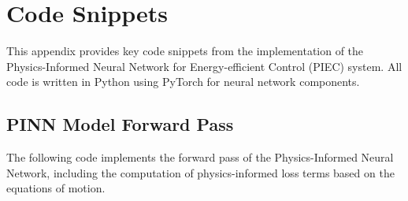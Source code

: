 \chapter{Code Snippets}
\label{appendix:code}

This appendix provides key code snippets from the implementation of the Physics-Informed Neural Network for Energy-efficient Control (PIEC) system. All code is written in Python using PyTorch for neural network components.

\section{PINN Model Forward Pass}
\label{sec:pinn_forward}

The following code implements the forward pass of the Physics-Informed Neural Network, including the computation of physics-informed loss terms based on the equations of motion.

